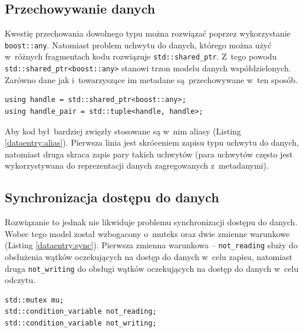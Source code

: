 \subsection{Przechowywanie danych}
Kwestię przechowania dowolnego typu można rozwiązać poprzez wykorzystanie \lstinline$boost::any$. Natomiast problem uchwytu do danych, którego można użyć w~różnych fragmentach kodu rozwiązuje \lstinline$std::shared_ptr$. Z~tego powodu \lstinline$std::shared_ptr<boost::any>$ stanowi trzon modelu danych współdzielonych. Zarówno dane jak i~towarzyszące im metadane są przechowywane w~ten sposób. 
 
\begin{minipage}{\textwidth}
	\begin{lstlisting}[label=dataentry:alias, caption={Aliasy używane w~kodzie aplikacji.},alsoletter={()[].=}]
using handle = std::shared_ptr<boost::any>;
using handle_pair = std::tuple<handle, handle>;
	\end{lstlisting}
\end{minipage}

Aby kod był bardziej zwięzły stosowane są w~nim aliasy (Listing \ref{dataentry:alias}). Pierwsza linia jest skróceniem zapisu typu uchwytu do danych, natomiast druga skraca zapis pary takich uchwytów (para uchwytów często jest wykorzystywana do reprezentacji danych zagregowanych z~metadanymi).

\subsection{Synchronizacja dostępu do danych}
Rozwiązanie to jednak nie likwiduje problemu synchronizacji dostępu do danych. Wobec tego model został wzbogacony o~muteks oraz dwie zmienne warunkowe (Listing \ref{dataentry:sync}). Pierwsza zmienna warunkowa -- \lstinline$not_reading$ służy do obsłużenia wątków oczekujących na dostęp do danych w~celu zapisu, natomiast druga \lstinline$not_writing$ do obsługi wątków oczekujących na dostęp do danych w~celu odczytu.

\begin{minipage}{\textwidth}
	\begin{lstlisting}[label=dataentry:sync, caption={Składowe klasy \lstinline$DataEntry$ zapewniające bezpieczne użycie w~środowisku wielowątkowym.},alsoletter={()[].=}]
std::mutex mu;
std::condition_variable not_reading;
std::condition_variable not_writing;
	\end{lstlisting}
\end{minipage}

